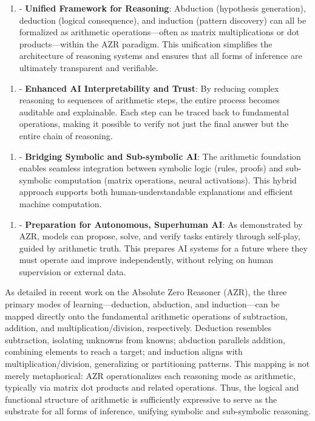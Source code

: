 \begin{enumerate}
  \item - \textbf{Unified Framework for Reasoning}: Abduction (hypothesis generation), deduction (logical consequence), and induction (pattern discovery) can all be formalized as arithmetic operations—often as matrix multiplications or dot products—within the AZR paradigm. This unification simplifies the architecture of reasoning systems and ensures that all forms of inference are ultimately transparent and verifiable.
\end{enumerate}

\begin{enumerate}
  \item - \textbf{Enhanced AI Interpretability and Trust}: By reducing complex reasoning to sequences of arithmetic steps, the entire process becomes auditable and explainable. Each step can be traced back to fundamental operations, making it possible to verify not just the final answer but the entire chain of reasoning.
\end{enumerate}

\begin{enumerate}
  \item - \textbf{Bridging Symbolic and Sub-symbolic AI}: The arithmetic foundation enables seamless integration between symbolic logic (rules, proofs) and sub-symbolic computation (matrix operations, neural activations). This hybrid approach supports both human-understandable explanations and efficient machine computation.
\end{enumerate}

\begin{enumerate}
  \item - \textbf{Preparation for Autonomous, Superhuman AI}: As demonstrated by AZR, models can propose, solve, and verify tasks entirely through self-play, guided by arithmetic truth. This prepares AI systems for a future where they must operate and improve independently, without relying on human supervision or external data.
\end{enumerate}

As detailed in recent work on the Absolute Zero Reasoner (AZR), the three primary modes of learning—deduction, abduction, and induction—can be mapped directly onto the fundamental arithmetic operations of subtraction, addition, and multiplication/division, respectively. Deduction resembles subtraction, isolating unknowns from knowns; abduction parallels addition, combining elements to reach a target; and induction aligns with multiplication/division, generalizing or partitioning patterns. This mapping is not merely metaphorical: AZR operationalizes each reasoning mode as arithmetic, typically via matrix dot products and related operations. Thus, the logical and functional structure of arithmetic is sufficiently expressive to serve as the substrate for all forms of inference, unifying symbolic and sub-symbolic reasoning.

